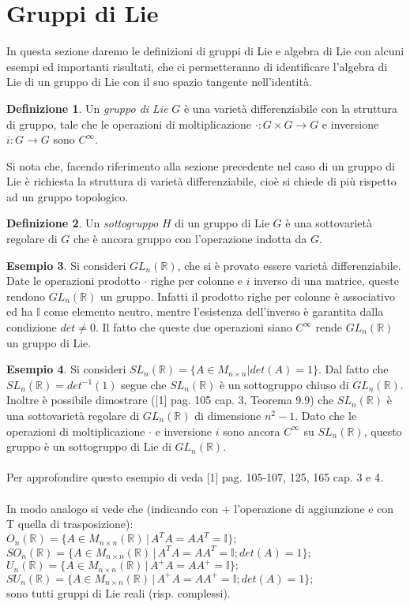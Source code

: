 \documentclass[12pt,a4paper]{report}
\theoremstyle{definition}
\newtheorem{Def}{Definizione}[chapter]
\theoremstyle{definition}
\newtheorem{Ex}[Def]{Esempio}
\theoremstyle{definition}
\theoremstyle{definition}
\begin{document}
\section{Gruppi di Lie}
In questa sezione daremo le definizioni di gruppi di Lie e algebra di Lie con alcuni esempi ed importanti risultati, che ci permetteranno di identificare l'algebra di Lie di un gruppo di Lie con il suo spazio tangente nell'identità.
\begin{Def}
	Un \textit{gruppo di Lie} $G$ è una varietà differenziabile con la struttura di gruppo, tale che le operazioni di moltiplicazione $\cdot:G\times G\rightarrow G$ e inversione $i:G\rightarrow G$ sono $C^\infty$.
\end{Def}
Si nota che, facendo riferimento alla sezione precedente nel caso di un gruppo di Lie è richiesta la struttura di varietà differenziabile, cioè si chiede di più rispetto ad un gruppo topologico.
\begin{Def}
	Un \textit{sottogruppo} $H$ di un gruppo di Lie $G$ è una sottovarietà regolare di $G$ che è ancora gruppo con l'operazione indotta da $G$.
\end{Def}
\begin{Ex}
	Si consideri $GL_n(\mathbb{R})$, che si è provato essere varietà differenziabile. Date le operazioni prodotto $\cdot$ righe per colonne e $i$ inverso di una matrice, queste rendono $GL_n(\mathbb{R})$ un gruppo. Infatti il prodotto righe per colonne è associativo ed ha $\mathbb{I}$ come elemento neutro, mentre l'esistenza dell'inverso è garantita dalla condizione $det\neq 0$. Il fatto che queste due operazioni siano $C^\infty$ rende $GL_n(\mathbb{R})$ un gruppo di Lie.
\end{Ex}
\begin{Ex}
	Si consideri $SL_n(\mathbb{R})=\{A\in M_{n\times n}| det(A)=1\}$. Dal fatto che $SL_n(\mathbb{R})=det^{-1}(1)$ segue che $SL_n(\mathbb{R})$ è un sottogruppo chiuso di $GL_n(\mathbb{R})$. Inoltre è possibile dimostrare ([1] pag. 105 cap. 3, Teorema 9.9) che $SL_n(\mathbb{R})$ è una sottovarietà regolare di $GL_n(\mathbb{R})$ di dimensione $n^2-1$. Dato che le operazioni di moltiplicazione $\cdot$ e inversione $i$ sono ancora $C^\infty$ su $SL_n(\mathbb{R})$, questo gruppo è un sottogruppo di Lie di $GL_n(\mathbb{R})$.\\
	\\
	Per approfondire questo esempio di veda [1] pag. 105-107, 125, 165 cap. 3 e 4.\\
	\\
	In modo analogo si vede che (indicando con $+$ l'operazione di aggiunzione e con T quella di trasposizione):\\
	$O_n(\mathbb{R})=\{A\in M_{n\times n}(\mathbb{R})\, |\, A^TA=AA^T=\mathbb{I}\};$\\
	$SO_n(\mathbb{R})=\{A\in M_{n\times n}(\mathbb{R})\, |\, A^TA=AA^T=\mathbb{I}; det(A)=1\};$\\
	$U_n(\mathbb{R})=\{A\in M_{n\times n}(\mathbb{R})\, |\, A^+A=AA^+=\mathbb{I}\};$\\
	$SU_n(\mathbb{R})=\{A\in M_{n\times n}(\mathbb{R})\, |\, A^+A=AA^+=\mathbb{I};det(A)=1\};$\\
	sono tutti gruppi di Lie reali (risp. complessi). 
\end{Ex}
\end{document}
